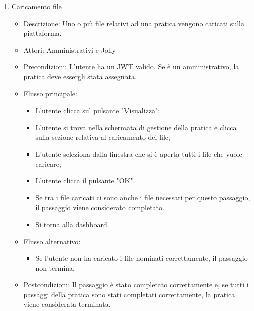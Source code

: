 \documentclass{article}
\begin{document}
\begin{enumerate}
    \item Caricamento file
    \begin{itemize}
        \item Descrizione: Uno o più file relativi ad una pratica vengono caricati sulla piattaforma.
        \item Attori: Amministrativi e Jolly
        \item Precondizioni: L'utente ha un JWT valido. Se è un amministrativo, la pratica deve essergli stata assegnata.
        \item Flusso principale: \begin{itemize}
            \item L'utente clicca sul pulsante "Visualizza";
            \item L'utente si trova nella schermata di gestione della pratica e clicca sulla sezione relativa al caricamento dei file;
            \item L'utente seleziona dalla finestra che si è aperta tutti i file che vuole caricare;
            \item L'utente clicca il pulsante "OK".
            \item Se tra i file caricati ci sono anche i file necessari per questo passaggio, il passaggio viene considerato completato.
            \item Si torna alla dashboard.
        \end{itemize}
        \item Flusso alternativo: \begin{itemize}
            \item Se l'utente non ha caricato i file nominati correttamente, il passaggio non termina. 
        \end{itemize}
        \item Postcondizioni: Il passaggio è stato completato correttamente e, se tutti i passaggi della pratica sono stati completati correttamente, la pratica viene considerata terminata.
    \end{itemize}


\end{enumerate}
\end{document}
